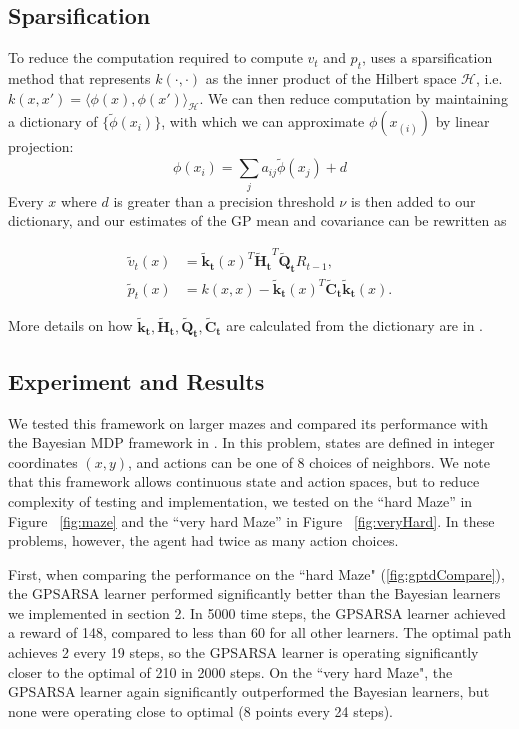 \documentclass[10pt, twocolumn, twoside]{article}
\begin{document}
\subsection{Sparsification}
To reduce the computation required to compute $v_t$ and $p_t$, \cite{engel} uses a sparsification
method that represents $k(\cdot, \cdot)$ as the inner product of the Hilbert space $\mathcal{H}$, i.e.
$k(x, x') = \langle \phi(x), \phi(x') \rangle_{\mathcal{H}}$. We can then reduce computation by maintaining
a dictionary of $\{\tilde{\phi}(x_i)\}$, with which we can approximate $\phi(x_{(i)})$ by linear projection:
$$\phi(x_i) = \sum_j a_{ij} \tilde{\phi}(x_j) + d$$
Every $x$ where $d$ is greater than a precision threshold $\nu$ is then added to our dictionary, and
our estimates of the GP mean and covariance can be rewritten as

\newcommand{\ktilde}{\mathbf{\tilde{k}_t}}
\newcommand{\Htilde}{\mathbf{\tilde{H}_t}}
\newcommand{\Qtilde}{\mathbf{\tilde{Q}_t}}
\newcommand{\Ctilde}{\mathbf{\tilde{C}_t}}

\begin{align*}
\tilde{v}_t(x) &= \ktilde(x)^T \Htilde^T \Qtilde R_{t-1},\\
\tilde{p}_t(x) &= k(x, x) - \ktilde(x)^T \Ctilde \ktilde(x).
\end{align*}

More details on how $\ktilde, \Htilde, \Qtilde, \Ctilde$ are calculated from the dictionary are in
\cite{engel}.

\subsection{Experiment and Results}
We tested this framework on larger mazes and compared its performance with the Bayesian MDP framework
in \cite{strens}. In this problem, states are defined in integer coordinates $(x, y)$, and actions can
be one of 8 choices of neighbors. We note that this framework allows continuous state and action spaces, 
but to reduce complexity of testing and implementation, we tested on the ``hard Maze'' in Figure
~\ref{fig:maze} and the ``very hard Maze'' in Figure ~\ref{fig:veryHard}. In these problems, however,
the agent had twice as many action choices.

First, when comparing the performance on the ``hard Maze" (\autoref{fig:gptdCompare}), the GPSARSA learner performed significantly better
than the Bayesian learners we implemented in section 2. In 5000 time steps, the GPSARSA learner achieved a reward of 148, compared to less than 60 for all other learners. The optimal path achieves 2 every 19 steps, so the GPSARSA learner is operating significantly closer to the optimal of 210 in 2000 steps. On the ``very hard Maze", the GPSARSA learner again significantly outperformed the Bayesian learners, but none were operating close to optimal (8 points every 24 steps).
\end{document}
